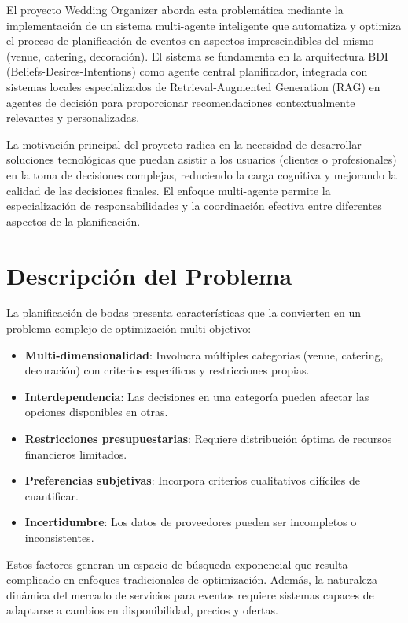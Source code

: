 \documentclass[runningheads,a4paper]{llncs}
\begin{document}
El proyecto Wedding Organizer aborda esta problemática mediante la implementación de un sistema multi-agente inteligente 
que automatiza y optimiza el proceso de planificación de eventos en aspectos imprescindibles del mismo (venue, catering, 
decoración). El sistema se fundamenta en la arquitectura BDI (Beliefs-Desires-Intentions) como agente central planificador, 
integrada con sistemas locales especializados de Retrieval-Augmented Generation (RAG) en agentes de decisión para 
proporcionar recomendaciones contextualmente relevantes y personalizadas.

La motivación principal del proyecto radica en la necesidad de desarrollar soluciones tecnológicas que puedan asistir a 
los usuarios (clientes o profesionales) en la toma de decisiones complejas, reduciendo la carga cognitiva y mejorando 
la calidad de las decisiones finales. El enfoque multi-agente permite la especialización de responsabilidades y la 
coordinación efectiva entre diferentes aspectos de la planificación.

\section{Descripción del Problema}

La planificación de bodas presenta características que la convierten en un problema complejo de optimización multi-objetivo:

\begin{itemize}
    \item \textbf{Multi-dimensionalidad}: Involucra múltiples categorías (venue, catering, decoración) con criterios 
    específicos y restricciones propias.
    \item \textbf{Interdependencia}: Las decisiones en una categoría pueden afectar las opciones disponibles en otras.
    \item \textbf{Restricciones presupuestarias}: Requiere distribución óptima de recursos financieros limitados.
    \item \textbf{Preferencias subjetivas}: Incorpora criterios cualitativos difíciles de cuantificar.
    \item \textbf{Incertidumbre}: Los datos de proveedores pueden ser incompletos o inconsistentes.
\end{itemize}

Estos factores generan un espacio de búsqueda exponencial que resulta complicado en enfoques tradicionales de optimización. 
Además, la naturaleza dinámica del mercado de servicios para eventos requiere sistemas capaces de adaptarse a cambios en 
disponibilidad, precios y ofertas.
\end{document}

